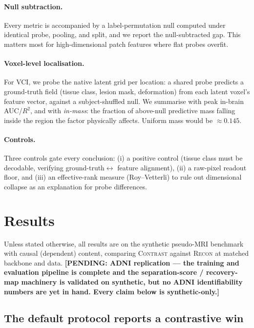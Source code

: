 \documentclass[11pt]{article}
\newcommand{\pending}[1]{{\color{red}\textbf{[PENDING: #1]}}}
\begin{document}
\paragraph{Null subtraction.} Every metric is accompanied by a
label-permutation null computed under identical probe, pooling, and split, and
we report the null-subtracted gap. This matters most for high-dimensional patch
features where flat probes overfit.

\paragraph{Voxel-level localisation.} For VCI, we probe the native latent grid
per location: a shared probe predicts a ground-truth field (tissue class, lesion
mask, deformation) from each latent voxel's feature vector, against a
subject-shuffled null. We summarise with peak in-brain AUC/$R^2$, and with
\emph{in-mass}: the fraction of above-null predictive mass falling inside the
region the factor physically affects. Uniform mass would be $\approx\!0.145$.

\paragraph{Controls.} Three controls gate every conclusion: (i) a positive
control (tissue class must be decodable, verifying ground-truth$\leftrightarrow$
feature alignment), (ii) a raw-pixel readout floor, and (iii) an effective-rank
measure (Roy--Vetterli) to rule out dimensional collapse as an explanation for
probe differences.

\section{Results}
\label{sec:results}

Unless stated otherwise, all results are on the synthetic pseudo-MRI benchmark
with causal (dependent) content, comparing \textsc{Contrast} against
\textsc{Recon} at matched backbone and data. \pending{ADNI replication --- the
training and evaluation pipeline is complete and the separation-score /
recovery-map machinery is validated on synthetic, but no ADNI identifiability
numbers are yet in hand. Every claim below is synthetic-only.}

\subsection{The default protocol reports a contrastive win}
\end{document}
